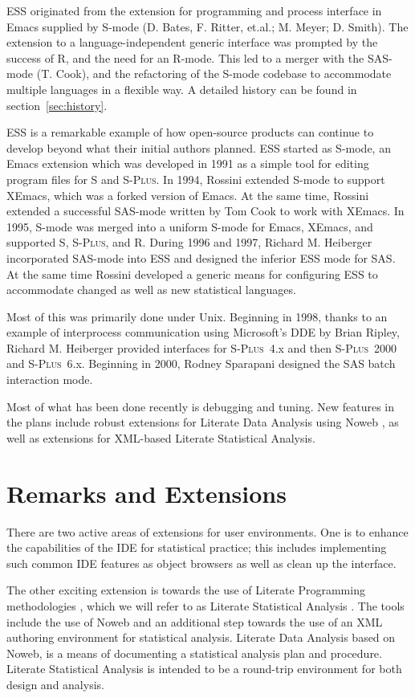 \documentclass{article}
\newcommand*{\Splus}{\textsc{S-Plus}}
\begin{document}
ESS originated from the extension for programming and process
interface in Emacs supplied by S-mode (D. Bates, F. Ritter, et.al.; 
M. Meyer; D. Smith).  The extension to a language-independent generic
interface was prompted by the success of R, and the need for an
R-mode.  This led to a merger with the SAS-mode (T. Cook), and the
refactoring of the S-mode codebase to accommodate multiple languages
in a flexible way.  A detailed history can be found in
section~\ref{sec:history}.

ESS is a remarkable example of how open-source products can continue
to develop beyond what their initial authors planned.  ESS started as
S-mode, an Emacs extension which was developed in 1991 as a simple
tool for editing program files for S and \Splus.  In 1994, Rossini
extended S-mode to support XEmacs, which was a forked version of
Emacs.  At the same time, Rossini extended a successful SAS-mode
written by Tom Cook to work with XEmacs.  In 1995, S-mode was merged
into a uniform S-mode for Emacs, XEmacs, and supported S, \Splus, and
R. During 1996 and 1997, Richard M. Heiberger incorporated 
SAS-mode into ESS and designed the inferior ESS mode for SAS.
At the same time Rossini developed a
generic means for configuring ESS to accommodate changed as well as
new statistical languages.

Most of this was primarily done under Unix.  Beginning in 1998, thanks
to an example of interprocess communication using Microsoft's DDE by
Brian Ripley, Richard M. Heiberger provided interfaces for \Splus~4.x
and then \Splus~2000 and \Splus~6.x.  Beginning in 2000, Rodney
Sparapani designed the SAS batch interaction mode.

Most of what has been done recently is debugging and tuning.  New
features in the plans include robust extensions for Literate Data
Analysis using Noweb \citep{NRamsey:1994}, as well as extensions for
XML-based Literate Statistical Analysis.

\section{Remarks and Extensions}
\label{sec:remarks}

There are two active areas of extensions for user environments.  One
is to enhance the capabilities of the IDE for statistical practice;
this includes implementing such common IDE features as object browsers
as well as clean up the interface.

The other exciting extension is towards the use of Literate
Programming methodologies \citep{Knuth:1992,NRamsey:1994}, which we
will refer to as Literate Statistical Analysis \citep{ross:lunt:2001}.
The tools include the use of Noweb \citep{NRamsey:1994} and an
additional step towards the use of an XML authoring environment for
statistical analysis.  Literate Data Analysis based on Noweb, is a
means of documenting a statistical analysis plan and procedure.
Literate Statistical Analysis is intended to be a round-trip
environment for both design and analysis.
\end{document}
